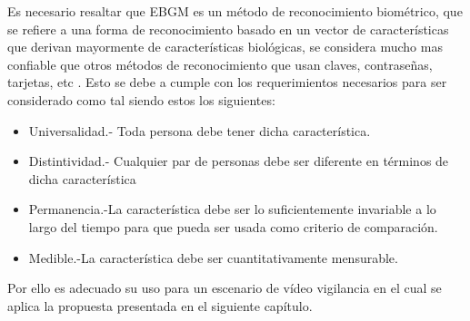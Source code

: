 Es necesario resaltar que \ac{EBGM} es un método de reconocimiento biométrico, que se refiere a una forma de reconocimiento basado en un vector de características que derivan mayormente de características biológicas, se considera mucho mas confiable que otros métodos de reconocimiento que usan claves, contraseñas, tarjetas, etc \cite{alice2003biometric}. Esto se debe a cumple con los requerimientos necesarios para ser considerado como tal siendo estos los siguientes:

\begin{itemize}
\item Universalidad.- Toda persona debe tener dicha característica.
\item Distintividad.- Cualquier par de personas debe ser diferente en términos de dicha característica
\item Permanencia.-La característica debe ser lo suficientemente invariable a lo largo del tiempo para que pueda ser usada como criterio de comparación.
\item Medible.-La característica debe ser cuantitativamente mensurable.
\end{itemize}

Por ello es adecuado su uso para un escenario de vídeo vigilancia en el cual se aplica la propuesta presentada en el siguiente capítulo.

